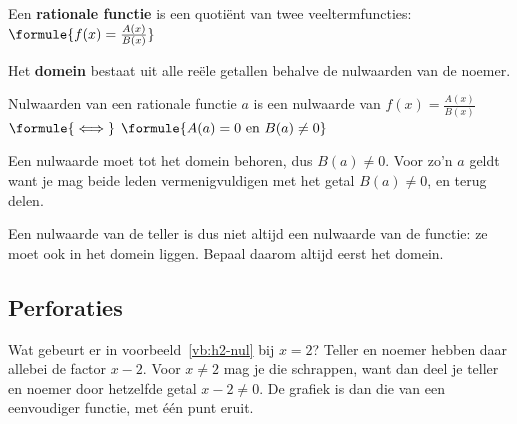 \begin{theorie}
Een \textbf{\textcolor{accent}{rationale functie}} is een quotiënt van twee veeltermfuncties: \quad $\formule{f(x) = \frac{A(x)}{B(x)}}$

Het \textbf{\textcolor{accent}{domein}} bestaat uit alle reële getallen behalve de nulwaarden van de noemer.

\begin{stelling}{Nulwaarden van een rationale functie}
$a$ is een nulwaarde van $f(x) = \frac{A(x)}{B(x)}$ \quad $\formule{\iff}$ \quad $\formule{A(a) = 0 \text{ en } B(a) \neq 0}$
\end{stelling}

\begin{bewijs}
Een nulwaarde moet tot het domein behoren, dus $B(a) \neq 0$. Voor zo'n $a$ geldt
want je mag beide leden vermenigvuldigen met het getal $B(a) \neq 0$, en terug delen.
\end{bewijs}
\end{theorie}

Een nulwaarde van de teller is dus niet altijd een nulwaarde van de functie: ze moet ook in het domein liggen. Bepaal daarom altijd eerst het domein.


\begin{oefeningen}
\end{oefeningen}

\subsection{Perforaties}

Wat gebeurt er in voorbeeld~\ref{vb:h2-nul} bij $x = 2$? Teller en noemer hebben daar allebei de factor $x - 2$. Voor $x \neq 2$ mag je die schrappen, want dan deel je teller en noemer door hetzelfde getal $x - 2 \neq 0$. De grafiek is dan die van een eenvoudiger functie, met één punt eruit.

